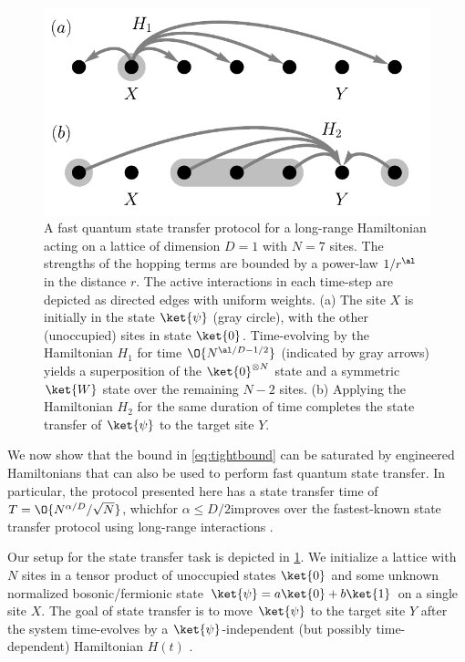 \begin{figure}
\includegraphics[width=0.9\linewidth]{figures/test_gong_protocol3.pdf}
\caption{A fast quantum state transfer protocol for a long-range Hamiltonian acting on a lattice of dimension $D=1$ with $N=7$ sites. The strengths of the hopping terms are bounded by a power-law $1/r^{\al}$ in the distance $r$. The active interactions in each time-step are depicted as directed edges with uniform weights. (a) The site $X$ is initially in the state $\ket{\psi}$ (gray circle), with the other (unoccupied) sites in state $\ket{0}$. Time-evolving by the Hamiltonian $H_1$ for time $\O{N^{\al/D-1/2}}$  (indicated by gray arrows) yields a superposition of the $\ket{0}^{\otimes N}$ state and a symmetric $\ket{W}$ state over the remaining $N-2$ sites. (b) Applying the Hamiltonian $H_2$ for the same duration of time completes the state transfer of $\ket{\psi}$ to the target site $Y$.}
\label{Fig_Gong}
\end{figure}

We now show that the bound in \cref{eq:tightbound} can be saturated by engineered Hamiltonians that can also be used to perform fast quantum state transfer. In particular, the protocol presented here has a state transfer time of $T = \O{N^{\alpha/D}/\sqrt{N}}$, which\dash for $\alpha\le D/2$\dash improves over the fastest-known state transfer protocol using long-range interactions \cite{Eldredge17}.

Our setup for the state transfer task is depicted in \cref{Fig_Gong}. We initialize a lattice with $N$ sites in a tensor product of unoccupied states $\ket{0}$ and some unknown normalized bosonic/fermionic state $\ket{\psi} = a\ket{0}+b\ket{1}$ on a single site $X$.
The goal of state transfer is to move $\ket{\psi}$ to the target site $Y$ after the system time-evolves by a $\ket{\psi}$-independent (but possibly time-dependent) Hamiltonian $H(t)$ \cite{NJ2014,Epstein17}.

